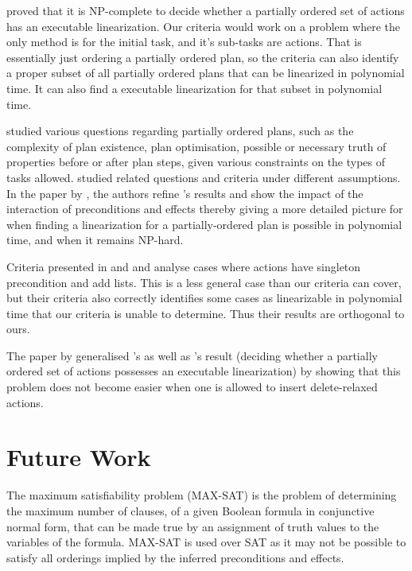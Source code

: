 \documentclass[letterpaper]{article} %
\begin{document}
\cite{ErolHTNExpressivity} proved that it is NP-complete to decide whether a partially ordered set
of actions has an executable linearization. Our criteria would work on a problem where the only method is for the initial task, and it’s sub-tasks are actions. That is essentially just ordering a partially ordered plan, so the criteria can also identify a proper subset of all partially ordered plans that can be linearized in polynomial time. It can also find a executable linearization for that subset in polynomial time.


\cite{NEBEL1994125} studied various questions regarding partially ordered plans, such as the complexity of plan existence, plan optimisation, possible or necessary truth of properties before or after plan steps, given various constraints on the types of tasks allowed.  \cite{KambhampatiModalTruth1996} studied related questions and criteria under different assumptions.
In the paper by \cite{TanGruningerPOPlanComplexity}, the authors refine \cite{NEBEL1994125}'s results and show the impact of the interaction of preconditions and effects thereby giving a more detailed picture for when finding a linearization for a partially-ordered plan is possible in polynomial time, and when it remains NP-hard. 

Criteria presented in \cite{NEBEL1994125} and \cite{KambhampatiModalTruth1996} and  \cite{TanGruningerPOPlanComplexity} analyse cases where actions have singleton precondition and add lists. This is a less general case than our criteria can cover, but their criteria also correctly identifies some cases as linearizable in polynomial time that our criteria is unable to determine. Thus their results are orthogonal to ours. 

The paper by \citet{DeleteRelaxation, Bercher2021POCLComplexities} generalised \cite{NEBEL1994125}'s as well as \cite{ErolHTNExpressivity}'s result (deciding whether a partially ordered
set of actions possesses an executable linearization) by showing that this problem does not become easier when one is allowed to insert delete-relaxed  actions.

\section{Future Work}
The maximum satisfiability problem (MAX-SAT) is the problem of determining the maximum number of clauses, of a given Boolean formula in conjunctive normal form, that can be made true by an assignment of truth values to the variables of the formula. MAX-SAT is used over SAT as it may not be possible to satisfy all orderings implied by the inferred preconditions and effects.
\end{document}
